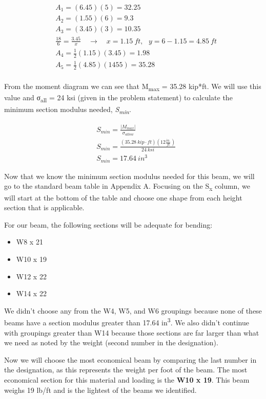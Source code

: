 \documentclass[
  letterpaper,
  DIV=11,
  numbers=noendperiod]{scrreprt}
\theoremstyle{definition}
\theoremstyle{remark}
\begin{document}
\begin{tcolorbox}
\begin{tcolorbox}
\[
\begin{aligned}
& A_1=(6.45)(5)=32.25 \\
& A_2=(1.55)(6)=9.3 \\
& A_3=(3.45)(3)=10.35 \\
& \frac{18}{6}=\frac{3.45}{x} \quad\rightarrow\quad x=1.15{~ft,}~~~y=6-1.15=4.85 {~ft} \\
& A_4=\frac{1}{2}(1.15)(3.45)=1.98 \\
& A_5=\frac{1}{2}(4.85)(1455)=35.28 \\
&
\end{aligned}
\]

From the moment diagram we can see that
\textbar M\textsubscript{max}\textbar{} = 35.28 kip*ft. We will use this
value and σ\textsubscript{all} = 24 ksi (given in the problem statement)
to calculate the minimum section modulus needed,
\emph{S\textsubscript{min}}.

\[
\begin{aligned}
& S_{min}=\frac{|M_{max}|}{\sigma_{allow}} \\
& S_{min}=\frac{(35.28{~kip}\cdot{ft})(12\frac{in.}{ft})}{24{~ksi}} \\
& S_{min}=17.64{~in}^3
\end{aligned}
\]

Now that we know the minimum section modulus needed for this beam, we
will go to the standard beam table in Appendix A. Focusing on the
S\textsubscript{x} column, we will start at the bottom of the table and
choose one shape from each height section that is applicable.

For our beam, the following sections will be adequate for bending:

\begin{itemize}
\item
  W8 x 21
\item
  W10 x 19
\item
  W12 x 22
\item
  W14 x 22
\end{itemize}

We didn't choose any from the W4, W5, and W6 groupings because none of
these beams have a section modulus greater than 17.64
in\textsuperscript{3}. We also didn't continue with groupings greater
than W14 because those sections are far larger than what we need as
noted by the weight (second number in the designation).

Now we will choose the most economical beam by comparing the last number
in the designation, as this represents the weight per foot of the beam.
The most economical section for this material and loading is the
\textbf{W10 x 19}. This beam weighs 19 lb/ft and is the lightest of the
beams we identified.

\end{tcolorbox}

\end{tcolorbox}
\end{document}
